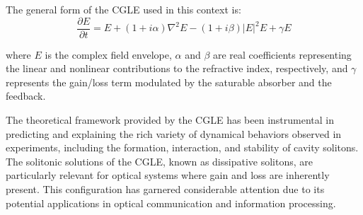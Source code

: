 The general form of the CGLE used in this context is:
\begin{equation}
    \frac{\partial E}{\partial t} = E + (1 + i\alpha)\nabla^2 E - (1 + i\beta)|E|^2E + \gamma E    
\end{equation}



where \(E\) is the complex field envelope, \(\alpha\) and \(\beta\) are real coefficients representing the linear and nonlinear contributions to the refractive index, respectively, and \(\gamma\) represents the gain/loss term modulated by the saturable absorber and the feedback.

The theoretical framework provided by the CGLE has been instrumental in predicting and explaining the rich variety of dynamical behaviors observed in experiments, including the formation, interaction, and stability of cavity solitons. The solitonic solutions of the CGLE, known as dissipative solitons, are particularly relevant for optical systems where gain and loss are inherently present.
This configuration has garnered considerable attention due to its potential applications in optical communication and information processing.



